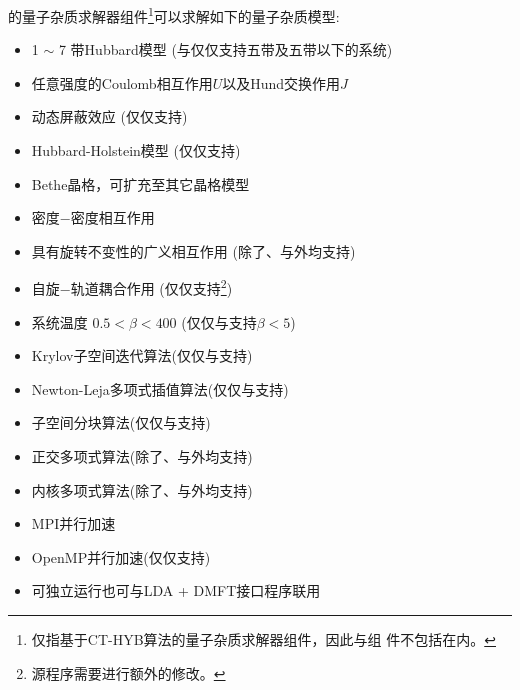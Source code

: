 {\iqist}的量子杂质求解器组件\footnote{仅指基于CT-HYB算法的量子杂质求解器组件，因此{\daisy}与{\sakura}组
件不包括在内。}可以求解如下的量子杂质模型:
\begin{itemize}
\item 1 $\sim$ 7 带Hubbard模型 ({\begonia}与{\lavender}仅仅支持五带及五带以下的系统)
\item 任意强度的Coulomb相互作用$U$以及Hund交换作用$J$
\item 动态屏蔽效应 (仅仅{\narcissus}支持)
\item Hubbard-Holstein模型 (仅仅{\narcissus}支持)
\item Bethe晶格，可扩充至其它晶格模型
\item 密度$-$密度相互作用
\item 具有旋转不变性的广义相互作用 (除了{\azalea}、{\gardenia}与{\narcissus}外均支持)
\item 自旋$-$轨道耦合作用 (仅仅{\lavender}支持\footnote{源程序需要进行额外的修改。})
\item 系统温度 $0.5 < \beta < 400$ (仅仅{\azalea}与{\gardenia}支持$\beta < 5$)
\item Krylov子空间迭代算法(仅仅{\camellia}与{\epiphyllum}支持)
\item Newton-Leja多项式插值算法(仅仅{\camellia}与{\epiphyllum}支持)
\item 子空间分块算法(仅仅{\pansy}与{\manjushaka}支持)
\item 正交多项式算法(除了{\azalea}、{\begonia}与{\pansy}外均支持)
\item 内核多项式算法(除了{\azalea}、{\begonia}与{\pansy}外均支持)
\item MPI并行加速
\item OpenMP并行加速(仅仅{\epiphyllum}支持)
\item 可独立运行也可与LDA + DMFT接口程序联用
\end{itemize}

